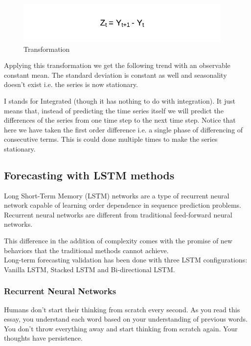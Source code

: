 \documentclass[12pt]{report}
\begin{document}
\begin{figure}[H]%
  \begin {center}
  \includegraphics[width=0.95\textwidth]{images/Transf.png}
  \caption{Transformation}
  \label{fig:ecg}
  \end {center}
\end{figure}

Applying this transformation we get the following trend with an observable constant mean. The standard deviation is constant as well and seasonality doesn’t exist i.e. the series is now stationary.

I stands for Integrated (though it has nothing to do with integration). It just means that, instead of predicting the time series itself we will predict the differences of the series from one time step to the next time step.
Notice that here we have taken the first order difference i.e. a single phase of differencing of consecutive terms. This is could done multiple times to make the series stationary.\cite{15}


\subsection{Forecasting with LSTM methods}
Long Short-Term Memory (LSTM) networks are a type of recurrent neural network capable of learning order dependence in sequence prediction problems.\\
Recurrent neural networks are different from traditional feed-forward neural networks.

This difference in the addition of complexity comes with the promise of new behaviors that the traditional methods cannot achieve.\\
Long-term forecasting validation has been done with three LSTM configurations: Vanilla LSTM, Stacked LSTM and Bi-directional LSTM. 

\subsubsection{Recurrent Neural Networks}
Humans don’t start their thinking from scratch every second. As you read this essay, you understand each word based on your understanding of previous words. You don’t throw everything away and start thinking from scratch again. Your thoughts have persistence.
\end{document}
